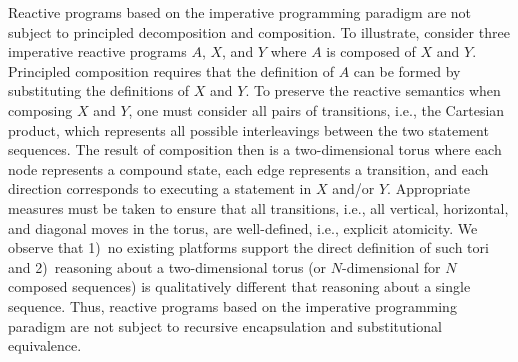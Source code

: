 Reactive programs based on the imperative programming paradigm are not subject to principled decomposition and composition.
To illustrate, consider three imperative reactive programs $A$, $X$, and $Y$ where $A$ is composed of $X$ and $Y$.
Principled composition requires that the definition of $A$ can be formed by substituting the definitions of $X$ and $Y$.
To preserve the reactive semantics when composing $X$ and $Y$, one must consider all pairs of transitions, i.e., the Cartesian product, which represents all possible interleavings between the two statement sequences.
The result of composition then is a two-dimensional torus where each node represents a compound state, each edge represents a transition, and each direction corresponds to executing a statement in $X$ and/or $Y$.
Appropriate measures must be taken to ensure that all transitions, i.e., all vertical, horizontal, and diagonal moves in the torus, are well-defined, i.e., explicit atomicity.
We observe that 1)~no existing platforms support the direct definition of such tori and 2)~reasoning about a two-dimensional torus (or $N$-dimensional for $N$ composed sequences) is qualitatively different that reasoning about a single sequence.
Thus, reactive programs based on the imperative programming paradigm are not subject to recursive encapsulation and substitutional equivalence.



